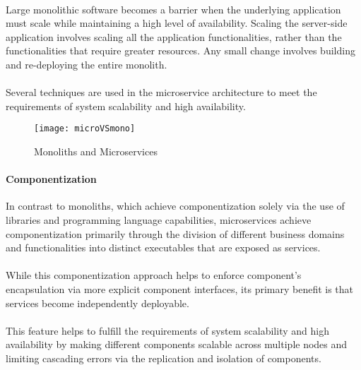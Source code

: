 \paragraph{}

Large monolithic software becomes a barrier when the underlying application must scale while maintaining a high level of availability.
Scaling the server-side application involves scaling all the application functionalities, rather than the functionalities that require greater resources.
Any small change involves building and re-deploying the entire monolith.

\paragraph{}

Several techniques are used in the microservice architecture to meet the requirements of system scalability and high availability.

\begin{figure}[htbp]
    \centering
    \texttt{[image: microVSmono]}
    \caption{Monoliths and Microservices \cite{microservices}}
    \label{fig:monoliths and microservices}
\end{figure}

\paragraph{Componentization}

In contrast to monoliths, which achieve componentization solely via the use of libraries and programming language capabilities,
microservices achieve componentization primarily through the division of different business domains and functionalities into distinct executables
that are exposed as services.

\paragraph{}

While this componentization approach helps to enforce component's encapsulation via more explicit component interfaces,
its primary benefit is that services become independently deployable.

\paragraph{}

This feature helps to fulfill the requirements of system scalability and high availability by
making different components scalable across multiple nodes and limiting cascading errors via the replication and isolation of components.

